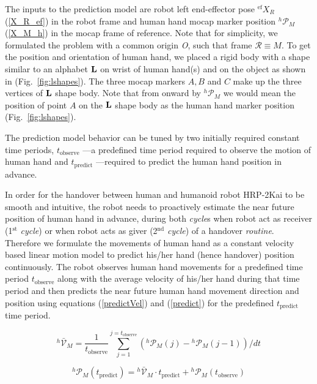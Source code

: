 The inputs to the prediction model are robot left end-effector pose $\mathcal{}^{\text{ef}}{X}_R$ (\ref{X_R_ef}) in the robot frame and human hand mocap marker position ${}^{h}\mathcal{P}_M$ (\ref{X_M_h}) in the mocap frame of reference. Note that for simplicity, we formulated the problem with a common origin {\it O}, such that frame $\mathcal R \equiv M$. To get the position and orientation of human hand, we placed a rigid body with a shape similar to an alphabet ${\bf L}$ on wrist of human hand(s) and on the object as shown in (Fig.~\ref{fig:lshapes}). The three mocap markers $A, B$ and $C$ make up the three vertices of ${\bf L}$ shape body. Note that from onward by ${}^{h}\mathcal{P}_M$ we would mean the position of point $A$ on the ${\bf L}$ shape body as the human hand marker position (Fig.~\ref{fig:lshapes}).

The prediction model behavior can be tuned by two initially required constant time periods, $t_\text{observe}$ ---a predefined time period required to observe the motion of human hand and $t_\text{predict}$ ---required to predict the human hand position in advance.

In order for the handover between human and humanoid robot HRP-2Kai to be smooth and intuitive, the robot needs to proactively estimate the near future position of human hand in advance, during both \textit{cycle}s when robot act as receiver (1$^\text{st}$ \textit{cycle}) or when robot acts as giver (2$^\text{nd}$ \textit{cycle}) of a handover \textit{routine}. Therefore we formulate the movements of human hand as a constant velocity based linear motion model to predict his/her hand (hence handover) position continuously. The robot observes human hand movements for a predefined time period $t_\text{observe}$ along with the average velocity of his/her hand during that time period and then predicts the near future human hand movement direction and position using equations (\ref{predictVel}) and (\ref{predict}) for the predefined  $t_\text{predict}$ time period.

\begin{equation} \label{predictVel}
{}^{h}\mathcal{\bar{V}}_{M} = \frac{1}{t_\text{observe}}{\sum_{j=1}^{j=t_\text{observe}} ({}^{h}\mathcal{P}_{M}(j)-{}^{h}\mathcal{P}_{M}(j-1))/dt }
\end{equation}

\begin{equation} \label{predict}
{}^{h}\mathcal{P}_M(t_\text{predict}) = {}^{h}\mathcal{\bar{V}}_{M} \cdot t_\text{predict}  + {}^{h}\mathcal{P}_{M}(t_\text{observe})
\end{equation}


